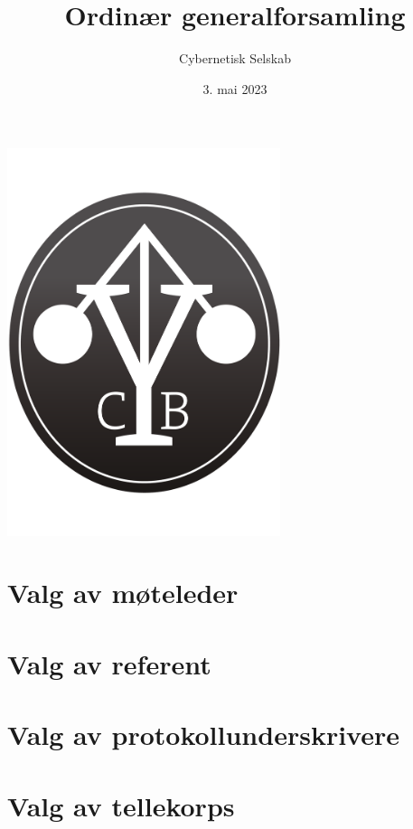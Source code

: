 \documentclass[10pt,norsk,a4paper,usenames,dvipsnames]{article}
\title{\huge Ordinær generalforsamling}
\author{\LARGE Cybernetisk Selskab}
\date{3. mai 2023}
\begin{document}
\maketitle



\begin{center}


\includegraphics[width=0.6\textwidth,height=0.6\textheight,keepaspectratio=true]{cyblogoa3.pdf}

\end{center}


\newpage


\tableofcontents

\section{Valg av møteleder}


\section{Valg av referent}


\section{Valg av protokollunderskrivere}


\section{Valg av tellekorps}
\end{document}
